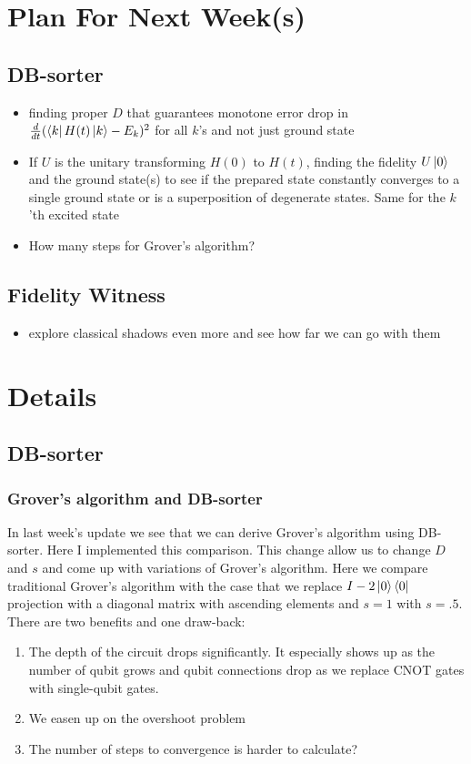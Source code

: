 \documentclass[11pt]{article}
\begin{document}
\section{Plan For Next Week(s)}
\subsection{DB-sorter}
\begin{itemize}
    \item finding proper $D$ that guarantees monotone error drop in $\frac{d}{dt}(\bra{k} H(t) \ket{k} - E_k)^2$ for all $k$'s and not just ground state
    \item If $U$ is the unitary transforming $H(0)$ to $H(t)$, finding the fidelity $U\ket{0}$ and the ground state(s) to see if the prepared state constantly converges to a single ground state or is a superposition of degenerate states. Same for the $k$'th excited state
    \item How many steps for Grover's algorithm?
\end{itemize}

\subsection{Fidelity Witness}
\begin{itemize}
    \item explore classical shadows even more and see how far we can go with them
\end{itemize}

\section{Details}
\subsection{DB-sorter}
\subsubsection{Grover's algorithm and DB-sorter}
\label{sec:grover}
In last week's update we see that we can derive Grover's algorithm using DB-sorter. Here I implemented this comparison. This change allow us to change $D$ and $s$ and come up with variations of Grover's algorithm.
Here we compare traditional Grover's algorithm with the case that we replace $I - 2\ket{0}\bra{0}$ projection with a diagonal matrix with ascending elements and $s=1$ with $s=.5$. There are two benefits and one draw-back:
\begin{enumerate}
    \item The depth of the circuit drops significantly. It especially shows up as the number of qubit grows and qubit connections drop as we replace CNOT gates with single-qubit gates.
    \item We easen up on the overshoot problem
    \item The number of steps to convergence is harder to calculate?
\end{enumerate}
\end{document}
